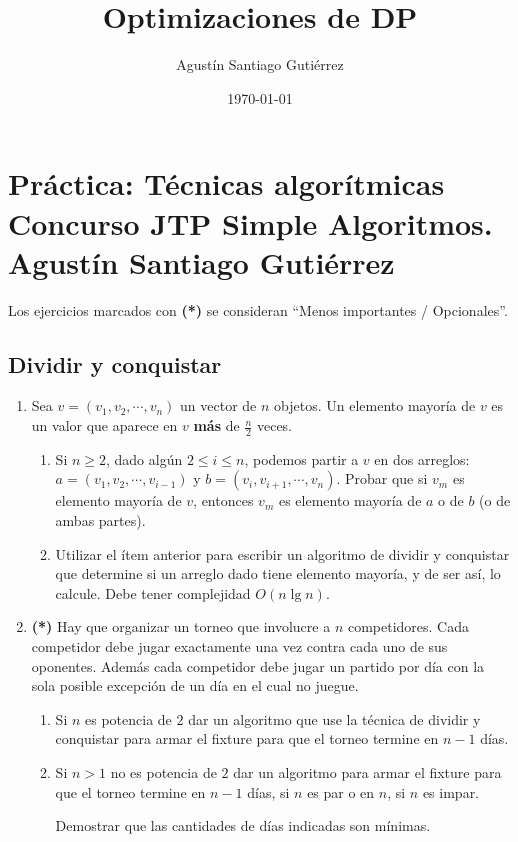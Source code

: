\documentclass{article}
\title{Optimizaciones de DP}
\author{Agustín Santiago Gutiérrez}
\date{\today}
\def\lg{\mathop{\mathrm {lg}}\nolimits}
\begin{document}

\section*{Práctica: Técnicas algorítmicas \\
{\small Concurso JTP Simple Algoritmos. Agustín Santiago Gutiérrez}}

Los ejercicios marcados con \textbf{(*)} se consideran ``Menos importantes / Opcionales''.

\subsection*{Dividir y conquistar}

    \begin{enumerate}[resume]
        \item Sea $v = (v_1, v_2, \cdots, v_n)$ un vector de $n$ objetos. Un elemento mayoría de $v$ es un valor que aparece en $v$ \textbf{más} de $\frac{n}{2}$ veces.
            \begin{enumerate}
                  \item Si $n \geq 2$, dado algún $2 \leq i \leq n$, podemos partir a $v$ en dos arreglos: $a = (v_1, v_2, \cdots, v_{i-1})$ y $b = (v_i, v_{i+1}, \cdots, v_n)$. Probar que si $v_m$ es elemento mayoría de $v$, entonces $v_m$ es elemento mayoría de $a$ o de $b$ (o de ambas partes).
                  \item Utilizar el ítem anterior para escribir un algoritmo de dividir y conquistar que determine si un arreglo dado tiene elemento mayoría, y de ser así, lo calcule. Debe tener complejidad $O(n \lg n)$.
            \end{enumerate}
        \item \textbf{(*)} Hay que organizar un torneo que involucre a $n$ competidores. Cada competidor debe jugar exactamente una vez contra cada uno de sus oponentes. Además cada competidor debe jugar un partido por día con la sola posible excepción de un día en el cual no juegue.
                    \begin{enumerate}
                        \item Si $n$ es potencia de $2$ dar un algoritmo que use la técnica de dividir y conquistar para armar el fixture
                               para que el torneo termine en $n-1$ días.
                        \item Si $n>1$ no es potencia de $2$ dar un algoritmo para armar el fixture para que el torneo termine en $n-1$ días, si $n$ es par o en $n$, si $n$ es impar.

                Demostrar que las cantidades de días indicadas son mínimas.
                    \end{enumerate}
    \end{enumerate}
\end{document}

